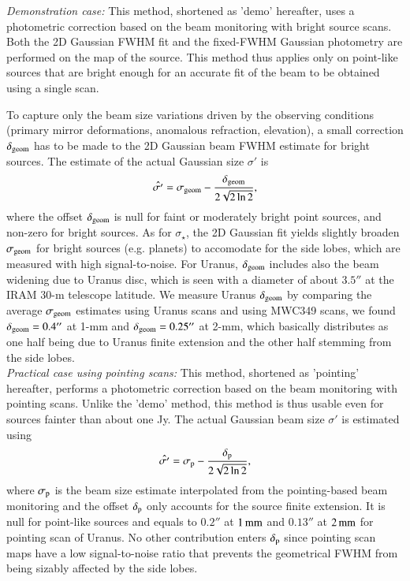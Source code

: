 \noindent \emph{Demonstration case:} This method, shortened as 'demo'
hereafter, uses a photometric correction based on the beam monitoring
with bright source scans. Both the 2D Gaussian FWHM fit and the
fixed-FWHM Gaussian photometry are performed on the map of the
source. This method thus applies only on point-like
sources that are bright enough for an accurate fit of the beam to be
obtained using a single scan.

To capture only the beam size variations driven by the
observing conditions (primary mirror deformations, anomalous
refraction, elevation), a small correction $\delta_{\rm{geom}}$ has to be made to
the 2D Gaussian beam FWHM estimate for bright sources. The estimate of the
actual Gaussian size $\sigma '$ is
\begin{equation}
  \hat{\sigma '} = \sigma_{\rm{geom}} - \frac{\delta_{\rm{geom}}}{2\sqrt{2 \ln{2}}}, 
\end{equation} 
where the offset $\delta_{\rm{geom}}$ is null for faint or moderately
bright point sources, and non-zero for bright sources.
As for $\sigma_\star$,  the 2D Gaussian fit yields slightly broaden
$\sigma_{\rm{geom}}$ for bright sources (e.g. planets) to accomodate
for the side lobes, which are measured with high signal-to-noise.
For Uranus, $\delta_{\rm{geom}}$ includes also the beam widening due
to Uranus disc, which is seen with a diameter of about $3.5''$ at the
IRAM 30-m telescope latitude. We measure Uranus $\delta_{\rm{geom}}$
by comparing the average $\sigma_{\rm{geom}}$ estimates using Uranus
scans and using MWC349 scans, we found $\delta_{\rm{geom}} = 0.4''$ at
1-mm and $\delta_{\rm{geom}} = 0.25''$ at 2-mm, which basically
distributes as one half being due to Uranus finite extension and the
other half stemming from the side lobes.\\

\noindent \emph{Practical case using pointing scans:} This method,
shortened as 'pointing' hereafter, performs a photometric correction
based on the beam monitoring with pointing scans. Unlike the 'demo'
method, this method is thus usable even for sources fainter than about
one Jy. The actual Gaussian beam size $\sigma '$ is estimated using
\begin{equation}
  \hat{\sigma '} = \sigma_{\rm{p}} - \frac{\delta_{\rm{p}}}{2\sqrt{2 \ln{2}}}, 
\end{equation} 
where $\sigma_{\rm{p}}$ is the beam size estimate interpolated from
the pointing-based beam monitoring and the offset $\delta_{\rm{p}}$
only accounts for the source finite extension. It is null for
point-like sources and equals to $0.2''$ at $1\,\rm{mm}$ and $0.13''$
at $2\,\rm{mm}$ for pointing scan of Uranus. No other contribution
enters $\delta_{\rm{p}}$ since pointing scan maps have a low signal-to-noise
ratio that prevents the geometrical FWHM from being sizably affected by the
side lobes.


